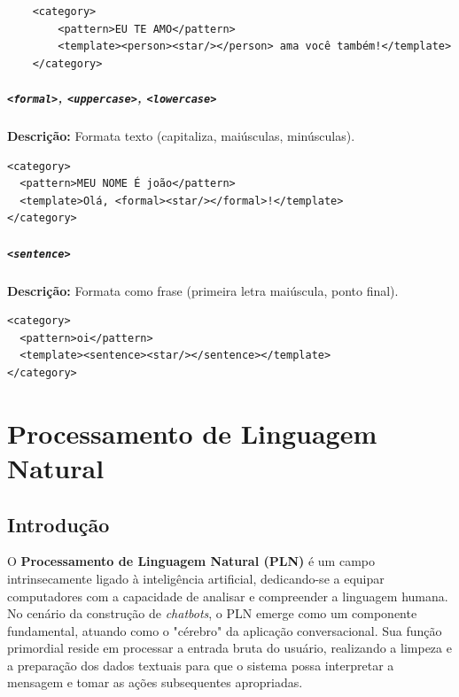 \documentclass[14pt,a4paper,oneside]{book}
\begin{document}
\begin{verbatim}
	<category>
		<pattern>EU TE AMO</pattern>
		<template><person><star/></person> ama você também!</template>
	</category>
\end{verbatim}

\paragraph{\texttt{<formal>}, \texttt{<uppercase>}, \texttt{<lowercase>}} 

\textbf{Descrição:} Formata texto (capitaliza, maiúsculas, minúsculas). 

\begin{verbatim}
<category>
  <pattern>MEU NOME É joão</pattern>
  <template>Olá, <formal><star/></formal>!</template>
</category>
\end{verbatim}

\paragraph{\texttt{<sentence>}} 

\textbf{Descrição:} Formata como frase (primeira letra maiúscula, ponto final). 

\begin{verbatim}
<category>
  <pattern>oi</pattern>
  <template><sentence><star/></sentence></template>
</category>
\end{verbatim}



\chapter{Processamento de Linguagem Natural}

\section{Introdução}

O \textbf{Processamento de Linguagem Natural (PLN)} é um campo intrinsecamente ligado à inteligência artificial, dedicando-se a equipar computadores com a capacidade de analisar e compreender a linguagem humana. No cenário da construção de \textit{chatbots}, o PLN emerge como um componente fundamental, atuando como o "cérebro" da aplicação conversacional. Sua função primordial reside em processar a entrada bruta do usuário, realizando a limpeza e a preparação dos dados textuais para que o sistema possa interpretar a mensagem e tomar as ações subsequentes apropriadas.
\end{document}
